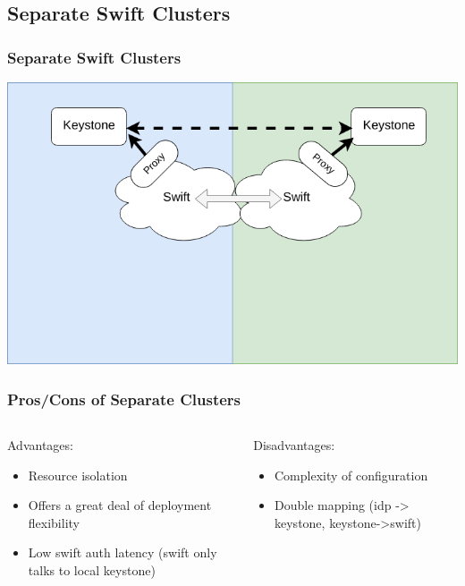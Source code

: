 \documentclass[aspectratio=169,11pt,hyperref={colorlinks=true}]{beamer}
\begin{document}
\subsection{Separate Swift Clusters}
\begin{frame}
\frametitle{Separate Swift Clusters}
\centering
\includegraphics[width=.775\textwidth]{swift-federation-sep-container-sync.png}
\end{frame}

\begin{frame}
\frametitle{Pros/Cons of Separate Clusters}
\begin{columns}[T]
    \begin{column}{.48\textwidth}
        Advantages:
        \begin{itemize}
            \item Resource isolation
            \item Offers a great deal of deployment flexibility
            \item Low swift auth latency (swift only talks to local keystone)
        \end{itemize}
    \end{column}
    \begin{column}{.48\textwidth}
        Disadvantages:
        \begin{itemize}
            \item Complexity of configuration
            \item Double mapping (idp -> keystone, keystone->swift)
        \end{itemize}
    \end{column}
\end{columns}
\end{frame}
\end{document}
